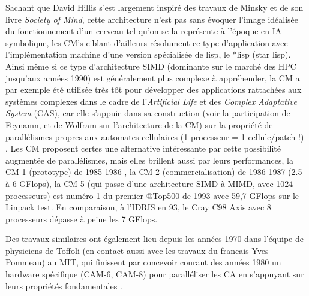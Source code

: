 Sachant que David Hillis s'est largement inspiré des travaux de Minsky et de son livre \textit{Society of Mind}, cette architecture n'est pas sans évoquer l'image idéalisée du fonctionnement d'un cerveau tel qu'on se la représente à l'époque en IA symbolique, les CM's ciblant d'ailleurs résolument ce type d'application avec l'implémentation machine d'une version spécialisée de lisp, le *lisp (star lisp). Ainsi même si ce type d’architecture SIMD (dominante sur le marché des HPC jusqu’aux années 1990) est généralement plus complexe à appréhender, la CM a par exemple été utilisée très tôt pour développer des applications rattachées aux systèmes complexes dans le cadre de l’\textit{Artificial Life} et des \textit{Complex Adaptative System} (CAS), car elle s’appuie dans sa construction (voir la participation de Feynamn, et de Wolfram sur l'architecture de la CM) sur la propriété de parallélismes propres aux automates cellulaires (1 processeur = 1 cellule/patch !) . Les CM proposent certes une alternative intéressante par cette possibilité augmentée de parallélismes, mais elles brillent aussi par leurs performances, la CM-1 (prototype) de 1985-1986 , la CM-2 (commercialisation) de 1986-1987 (2.5 à 6 GFlops), la CM-5 (qui passe d'une architecture SIMD à MIMD, avec 1024 processeurs) est numéro 1 du premier \href{http://www.top500.org/featured/systems/cm-5-los-alamos-national-lab/}{@Top500} de 1993 avec 59,7 GFlops sur le Linpack test. En comparaison, à l'IDRIS en 93, le Cray C98 Axis avec 8 processeurs dépasse à peine les 7 GFlops.

Des travaux similaires ont également lieu depuis les années 1970 dans l’équipe de physiciens de Toffoli (en contact aussi avec les travaux du francais Yves Pommeau) au MIT, qui finissent par concevoir courant des années 1980 un hardware spécifique (CAM-6, CAM-8) pour paralléliser les CA en s’appuyant sur leurs propriétés fondamentales .


